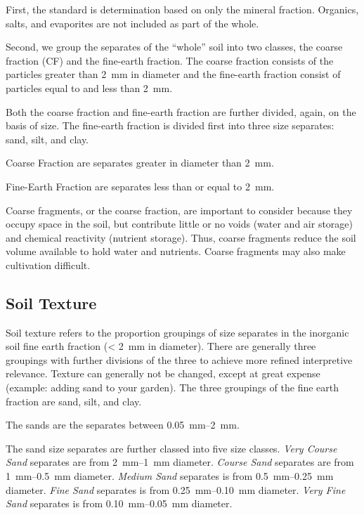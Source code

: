\documentclass{book}
\begin{document}
First, the standard is determination based on only the mineral fraction. Organics, salts, and evaporites are not included as part of the whole.
    
Second, we group the separates of the “whole” soil into two classes, the coarse fraction (CF) and the fine-earth fraction. The coarse fraction consists of the particles greater than \qty{2}{mm} in diameter and the fine-earth fraction consist of particles equal to and less than \qty{2}{mm}.
    
Both the coarse fraction and fine-earth fraction are further divided, again, on the basis of size. The fine-earth fraction is divided first into three size separates: sand, silt, and clay.
    
Coarse Fraction are separates greater in diameter than \qty{2}{mm}.
    
Fine-Earth Fraction are separates less than or equal to \qty{2}{mm}.
    
Coarse fragments, or the coarse fraction, are important to consider because they occupy space in the soil, but contribute little or no voids (water and air storage) and chemical reactivity (nutrient storage). Thus, coarse fragments reduce the soil volume available to hold water and nutrients. Coarse fragments may also make cultivation difficult.

\subsection{Soil Texture}
    
Soil texture refers to the proportion groupings of size separates in the inorganic soil fine earth fraction (\qty{< 2}{mm} in diameter). There are generally three groupings with further divisions of the three to achieve more refined interpretive relevance. Texture can generally not be changed, except at great expense (example: adding sand to your garden). The three groupings of the fine earth fraction are sand, silt, and clay.
    
The sands are the separates between \qtyrange{0.05}{2}{mm}.

The sand size separates are further classed into five size classes. \emph{Very Course Sand} separates are from \qtyrange{2}{1}{mm} diameter. \emph{Course Sand} separates are from \qtyrange{1}{0.5}{mm} diameter. \emph{Medium Sand} separates is from \qtyrange{0.5}{0.25}{mm} diameter. \emph{Fine Sand} separates is from \qtyrange{0.25}{0.10}{mm} diameter. \emph{Very Fine Sand} separates is from \qtyrange{0.10}{0.05}{mm} diameter.
    
\end{document}
